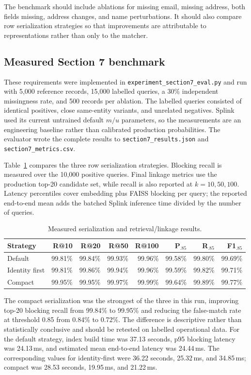 \documentclass[conference]{IEEEtran}
\begin{document}
The benchmark should include ablations for missing email, missing address, both fields missing, address changes, and name perturbations. It should also compare row serialization strategies so that improvements are attributable to representations rather than only to the matcher.

\subsection{Measured Section 7 benchmark}
These requirements were implemented in \texttt{experiment\_section7\_eval.py} and run with 5,000 reference records, 15,000 labelled queries, a 30\% independent missingness rate, and 500 records per ablation. The labelled queries consisted of identical positives, close same-entity variants, and unrelated negatives. Splink used its current untrained default $m/u$ parameters, so the measurements are an engineering baseline rather than calibrated production probabilities. The evaluator wrote the complete results to \texttt{section7\_results.json} and \texttt{section7\_metrics.csv}.

Table~\ref{tab:section7-strategies} compares the three row serialization strategies. Blocking recall is measured over the 10,000 positive queries. Final linkage metrics use the production top-20 candidate set, while recall is also reported at $k=10,50,100$. Latency percentiles cover embedding plus FAISS blocking per query; the reported end-to-end mean adds the batched Splink inference time divided by the number of queries.

\begin{table}[t]
\centering
\caption{Measured serialization and retrieval/linkage results.}
\label{tab:section7-strategies}
\small
\begin{tabular}{lrrrrrrr}
\toprule
Strategy & R@10 & R@20 & R@50 & R@100 & P$_{.85}$ & R$_{.85}$ & F1$_{.85}$ \\
\midrule
Default & 99.81\% & 99.84\% & 99.93\% & 99.96\% & 99.58\% & 99.80\% & 99.69\% \\
Identity first & 99.81\% & 99.86\% & 99.94\% & 99.96\% & 99.59\% & 99.82\% & 99.71\% \\
Compact & 99.95\% & 99.95\% & 99.97\% & 99.99\% & 99.64\% & 99.89\% & 99.77\% \\
\bottomrule
\end{tabular}
\end{table}

The compact serialization was the strongest of the three in this run, improving top-20 blocking recall from 99.84\% to 99.95\% and reducing the false-match rate at threshold 0.85 from 0.84\% to 0.72\%. The difference is descriptive rather than statistically conclusive and should be retested on labelled operational data. For the default strategy, index build time was 37.13 seconds, p95 blocking latency was 24.13\,ms, and estimated mean end-to-end latency was 24.44\,ms. The corresponding values for identity-first were 36.22 seconds, 25.32\,ms, and 34.85\,ms; compact was 28.53 seconds, 19.95\,ms, and 21.22\,ms.
\end{document}
